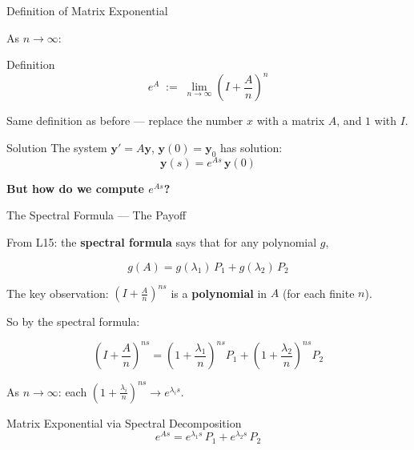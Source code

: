 \documentclass[10pt]{beamer}
\theoremstyle{definition}
\newcommand{\x}[1]{\alert{\textbf{#1}}}
\begin{document}
\begin{frame}{Definition of Matrix Exponential}

As $n \to \infty$:

\begin{block}{Definition}
$$e^{A} \;:=\; \lim_{n\to\infty}\left(I + \frac{A}{n}\right)^n$$
\end{block}

\vfill

Same definition as before --- replace the number $x$ with a matrix $A$, and $1$ with $I$.

\vfill\pause

\begin{block}{Solution}
The system $\mathbf{y}' = A\mathbf{y}$, \; $\mathbf{y}(0) = \mathbf{y}_0$ has solution:
$$\boxed{\mathbf{y}(s) = e^{As}\,\mathbf{y}(0)}$$
\end{block}

\vfill\pause

\textbf{But how do we compute $e^{As}$?}

\end{frame}


\begin{frame}{The Spectral Formula --- The Payoff}

From L15: the \x{spectral formula} says that for any polynomial $g$,

$$g(A) = g(\lambda_1)\,P_1 + g(\lambda_2)\,P_2$$

\vfill\pause

The key observation: $\left(I+\frac{A}{n}\right)^{ns}$ is a \x{polynomial} in $A$ (for each finite $n$).

\vfill

So by the spectral formula:

$$\left(I+\frac{A}{n}\right)^{ns} = \left(1+\frac{\lambda_1}{n}\right)^{ns} P_1 + \left(1+\frac{\lambda_2}{n}\right)^{ns} P_2$$

\vfill\pause

As $n \to \infty$: each $\left(1+\frac{\lambda_i}{n}\right)^{ns} \to e^{\lambda_i s}$.

\vfill

\begin{block}{Matrix Exponential via Spectral Decomposition}
$$\boxed{e^{As} = e^{\lambda_1 s}\,P_1 + e^{\lambda_2 s}\,P_2}$$
\end{block}

\end{frame}
\end{document}
